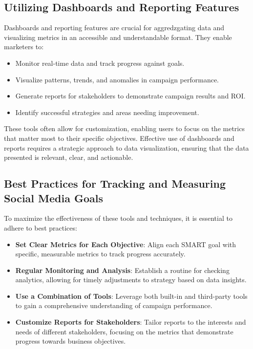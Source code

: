 \documentclass[
]{book}
\providecommand{\tightlist}{%
  \setlength{\itemsep}{0pt}\setlength{\parskip}{0pt}}
\begin{document}
\hypertarget{utilizing-dashboards-and-reporting-features}{%
\subsection*{Utilizing Dashboards and Reporting Features}\label{utilizing-dashboards-and-reporting-features}}

Dashboards and reporting features are crucial for aggredzgating data and visualizing metrics in an accessible and understandable format. They enable marketers to:

\begin{itemize}
\tightlist
\item
  Monitor real-time data and track progress against goals.
\item
  Visualize patterns, trends, and anomalies in campaign performance.
\item
  Generate reports for stakeholders to demonstrate campaign results and ROI.
\item
  Identify successful strategies and areas needing improvement.
\end{itemize}

These tools often allow for customization, enabling users to focus on the metrics that matter most to their specific objectives. Effective use of dashboards and reports requires a strategic approach to data visualization, ensuring that the data presented is relevant, clear, and actionable.

\hypertarget{best-practices-for-tracking-and-measuring-social-media-goals}{%
\subsection*{Best Practices for Tracking and Measuring Social Media Goals}\label{best-practices-for-tracking-and-measuring-social-media-goals}}

To maximize the effectiveness of these tools and techniques, it is essential to adhere to best practices:

\begin{itemize}
\tightlist
\item
  \textbf{Set Clear Metrics for Each Objective}: Align each SMART goal with specific, measurable metrics to track progress accurately.
\item
  \textbf{Regular Monitoring and Analysis}: Establish a routine for checking analytics, allowing for timely adjustments to strategy based on data insights.
\item
  \textbf{Use a Combination of Tools}: Leverage both built-in and third-party tools to gain a comprehensive understanding of campaign performance.
\item
  \textbf{Customize Reports for Stakeholders}: Tailor reports to the interests and needs of different stakeholders, focusing on the metrics that demonstrate progress towards business objectives.
\end{itemize}
\end{document}
